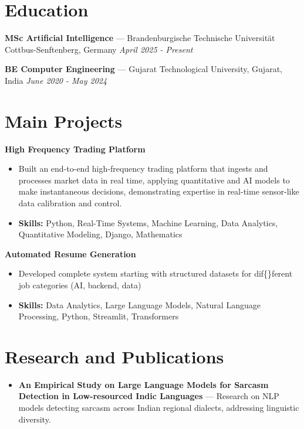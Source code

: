 \documentclass[a4paper,10pt]{article}
\begin{document}
\section*{Education}
\textbf{MSc Artificial Intelligence} — Brandenburgische Technische Universität Cottbus-Senftenberg, Germany \hfill \textit{April 2025 - Present}\par
\vspace{1.5pt}
\textbf{BE Computer Engineering} — Gujarat Technological University, Gujarat, India \hfill \textit{June 2020 - May 2024}\par

\section*{Main Projects}
\textbf{High Frequency Trading Platform}\par
\vspace{1pt}
\begin{itemize}
  \item Built an end-to-end high-frequency trading platform that ingests and processes market data in real time, applying quantitative and AI models to make instantaneous decisions, demonstrating expertise in real-time sensor-like data calibration and control.
  \item \textbf{Skills:} Python, Real-Time Systems, Machine Learning, Data Analytics, Quantitative Modeling, Django, Mathematics
\end{itemize}
\vspace{3pt}
\textbf{Automated Resume Generation}\par
\vspace{1pt}
\begin{itemize}
  \item Developed complete system starting with structured datasets for dif\{\}ferent job categories (AI, backend, data)
  \item \textbf{Skills:} Data Analytics, Large Language Models, Natural Language Processing, Python, Streamlit, Transformers
\end{itemize}

\section*{Research and Publications}
\begin{itemize}
\item \textbf{An Empirical Study on Large Language Models for Sarcasm Detection in Low-resourced Indic Languages} — Research on NLP models detecting sarcasm across Indian regional dialects, addressing linguistic diversity.
\end{itemize}
\end{document}
